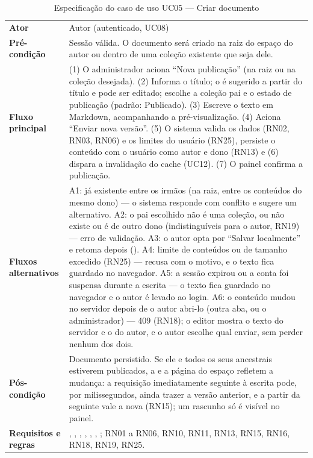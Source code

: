 \begin{table}[htb]
\caption{Especificação do caso de uso UC05 --- Criar documento}\label{tab:uc05}
\small
\begin{tabularx}{\linewidth}{@{}L{3.0cm}Y@{}}
\toprule
\textbf{Ator} & Autor (autenticado, UC08)\\
\textbf{Pré-condição} & Sessão válida. O documento será criado na raiz do espaço do autor ou dentro de uma coleção existente que seja dele.\\
\textbf{Fluxo principal} & (1) O administrador aciona ``Nova publicação'' (na raiz ou na coleção desejada). (2) Informa o título; o  é sugerido a partir do título e pode ser editado; escolhe a coleção pai e o estado de publicação (padrão: Publicado). (3) Escreve o texto em Markdown, acompanhando a pré-visualização. (4) Aciona ``Enviar nova versão''. (5) O sistema valida os dados (RN02, RN03, RN06) e os limites do usuário (RN25), persiste o conteúdo com o usuário como autor e dono (RN13) e (6) dispara a invalidação do cache (UC12). (7) O painel confirma a publicação.\\
\textbf{Fluxos alternativos} & A1:  já existente entre os irmãos (na raiz, entre os conteúdos do mesmo dono) --- o sistema responde com conflito e sugere um  alternativo. A2: o pai escolhido não é uma coleção, ou não existe ou é de outro dono (indistinguíveis para o autor, RN19) --- erro de validação. A3: o autor opta por ``Salvar localmente'' e retoma depois (). A4: limite de conteúdos ou de tamanho excedido (RN25) --- recusa com o motivo, e o texto fica guardado no navegador. A5: a sessão expirou ou a conta foi suspensa durante a escrita --- o texto fica guardado no navegador e o autor é levado ao login. A6: o conteúdo mudou no servidor depois de o autor abri-lo (outra aba, ou o administrador) --- 409  (RN18); o editor mostra o texto do servidor e o do autor, e o autor escolhe qual enviar, sem perder nenhum dos dois.\\
\textbf{Pós-condição} & Documento persistido. Se ele e todos os seus ancestrais estiverem publicados, a  e a página do espaço refletem a mudança: a requisição imediatamente seguinte à escrita pode, por milissegundos, ainda trazer a versão anterior, e a partir da seguinte vale a nova (RN15); um rascunho só é visível no painel.\\
\textbf{Requisitos e regras} & , , , , , , ; RN01 a RN06, RN10, RN11, RN13, RN15, RN16, RN18, RN19, RN25.\\
\bottomrule
\end{tabularx}
\end{table}

